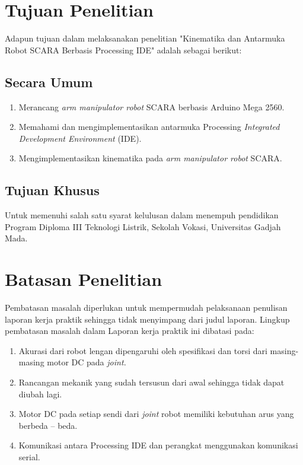 \section{Tujuan Penelitian}
Adapun tujuan dalam melaksanakan penelitian "Kinematika dan Antarmuka Robot SCARA Berbasis Processing IDE" adalah sebagai berikut:

	\subsection{Secara Umum}
		\begin{enumerate}
		\item Merancang\emph{ arm manipulator robot} SCARA berbasis Arduino Mega 2560.
		\item Memahami dan mengimplementasikan antarmuka Processing \textit{Integrated Development Environment} (IDE).
		\item Mengimplementasikan kinematika pada \emph{arm manipulator robot} SCARA.
	\end{enumerate}
	\subsection{Tujuan Khusus}
	 Untuk memenuhi salah satu syarat kelulusan dalam menempuh pendidikan Program   Diploma III Teknologi Listrik, Sekolah Vokasi, Universitas Gadjah Mada. 
	
	
\section{Batasan Penelitian}
	Pembatasan masalah diperlukan untuk mempermudah pelaksanaan penulisan laporan kerja praktik sehingga tidak menyimpang dari judul laporan. Lingkup pembatasan masalah dalam Laporan kerja praktik ini dibatasi pada:
	
	\begin{enumerate}
		
		\item Akurasi dari robot lengan dipengaruhi oleh spesifikasi dan torsi dari masing-masing motor DC pada \emph{ joint.}
		\item  Rancangan mekanik yang sudah tersusun dari awal sehingga tidak dapat diubah lagi. 
		\item Motor DC pada setiap sendi dari \emph{joint} robot memiliki kebutuhan arus yang berbeda – beda. 
		\item Komunikasi antara Processing IDE dan perangkat menggunakan komunikasi serial.
		
	\end{enumerate}

